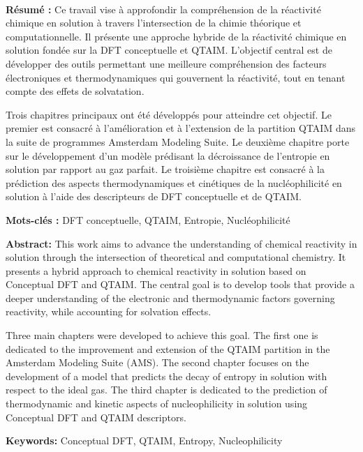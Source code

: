 \newpage
\thispagestyle{empty}
\newpage
\ %
\newpage
\thispagestyle{empty}

\vspace*{0.2cm}%

\noindent \textbf{Résumé :} Ce travail vise à approfondir la compréhension de la
réactivité chimique en solution à travers l'intersection de la chimie théorique
et computationnelle.  Il présente une approche hybride de la réactivité
chimique en solution fondée sur la DFT conceptuelle et QTAIM. L'objectif
central est de développer des outils permettant une meilleure compréhension des
facteurs électroniques et thermodynamiques qui gouvernent la réactivité, tout
en tenant compte des effets de solvatation.

Trois chapitres principaux ont été développés pour atteindre cet objectif.  Le  
premier est consacré à l'amélioration et à l'extension de la partition QTAIM
dans la suite de programmes Amsterdam Modeling Suite. Le deuxième chapitre
porte sur le développement d'un modèle prédisant la décroissance de l'entropie
en solution par rapport au gaz parfait. Le troisième chapitre est consacré à
la prédiction des aspects thermodynamiques et cinétiques de la nucléophilicité
en solution à l'aide des descripteurs de DFT conceptuelle et de QTAIM.

\noindent \textbf{Mots-clés :} DFT conceptuelle, QTAIM, Entropie, Nucléophilicité

\vspace{1.2cm}%

\noindent \textbf{Abstract:} This work aims to advance the understanding of chemical
reactivity in solution through the intersection of theoretical and
computational chemistry. It presents a hybrid approach to chemical reactivity
in solution based on Conceptual DFT and QTAIM. The central goal is to develop
tools that provide a deeper understanding of the electronic and thermodynamic
factors governing reactivity, while accounting for solvation effects.

Three main chapters were developed to achieve this goal. The first
one is dedicated to the improvement and extension of the QTAIM partition in the
Amsterdam Modeling Suite (AMS). The second chapter focuses on the development
of a model that predicts the decay of entropy in solution with respect to the
ideal gas. The third chapter is dedicated to the prediction of thermodynamic
and kinetic aspects of nucleophilicity in solution using Conceptual DFT and
QTAIM descriptors.

\noindent \textbf{Keywords:} Conceptual DFT, QTAIM, Entropy, Nucleophilicity
